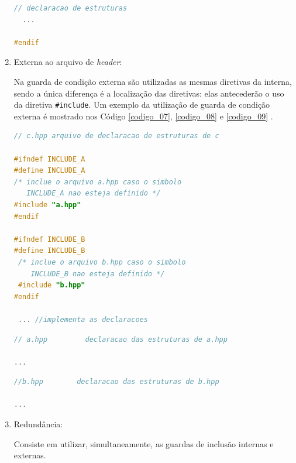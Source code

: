 \begin{enumerate}
\begin{lstlisting}[language=C++,caption={
                        Arquivo a.hpp contendo guardas de inclusão interna},
                                                            label=codigo_06]
  // declaracao de estruturas 
  ...

#endif
\end{lstlisting}


\item Externa ao arquivo de \textit{header}:
 
Na  guarda de condição externa  são utilizadas as mesmas diretivas da interna,
 sendo a única diferença é a localização das diretivas: elas antecederão o uso
 da diretiva \texttt{\#include}. Um exemplo da utilização de guarda de condição 
externa é mostrado nos Código \ref{codigo_07}, \ref{codigo_08} e
 \ref{codigo_09} \cite[pág. 80]{ref42}.


\begin{lstlisting}[language=C++,caption={
					    Arquivo c.hpp contendo guardas de inclusão externa},
                                                            label=codigo_07]
// c.hpp arquivo de declaracao de estruturas de c

#ifndef INCLUDE_A
#define INCLUDE_A
/* inclue o arquivo a.hpp caso o simbolo 
   INCLUDE_A nao esteja definido */
#include "a.hpp"
#endif
        
#ifndef INCLUDE_B
#define INCLUDE_B
 /* inclue o arquivo b.hpp caso o simbolo 
    INCLUDE_B nao esteja definido */
 #include "b.hpp"
#endif

 ... //implementa as declaracoes

\end{lstlisting}

\begin{lstlisting}[language=C++,caption={
						   Arquivo a.hpp com guarda de inclusão externa},
                                                         label=codigo_08]
// a.hpp         declaracao das estruturas de a.hpp

...

\end{lstlisting}

\begin{lstlisting}[language=C++,caption={
					         Arquivo b.hpp com guarda de inclusão externa},
                                                           label=codigo_09]
//b.hpp        declaracao das estruturas de b.hpp

...

\end{lstlisting}


\item Redundância:\label{redundancia_melhor}

Consiste em utilizar, simultaneamente, as guardas de inclusão internas e 
externas. 


\end{enumerate}
